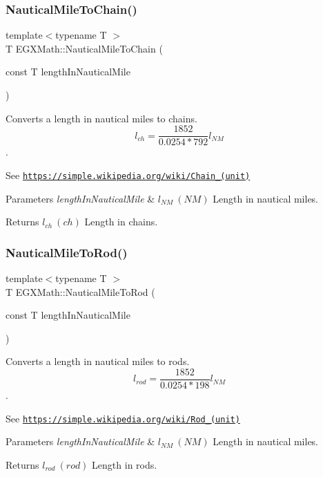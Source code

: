 \subsubsection{\texorpdfstring{Nautical\+Mile\+To\+Chain()}{NauticalMileToChain()}}
{\footnotesize\ttfamily template$<$typename T $>$ \\
T E\+G\+X\+Math\+::\+Nautical\+Mile\+To\+Chain (\begin{DoxyParamCaption}\item[{const T}]{length\+In\+Nautical\+Mile }\end{DoxyParamCaption})}



Converts a length in nautical miles to chains. \[ l_{ch}= \frac{1852}{0.0254 * 792} l_{NM} \]. 

See \href{https://simple.wikipedia.org/wiki/Chain_(unit)}{\tt https\+://simple.\+wikipedia.\+org/wiki/\+Chain\+\_\+(unit)} 
\begin{DoxyParams}{Parameters}
{\em length\+In\+Nautical\+Mile} & $ l_{NM}\ (NM)$ Length in nautical miles. \\
\hline
\end{DoxyParams}
\begin{DoxyReturn}{Returns}
$ l_{ch}\ (ch)$ Length in chains. 
\end{DoxyReturn}
\mbox{\label{group___e_g_x_math-_conversions-_length_conversions-_non-_s_i-_nautical_mile-_surveyors_gafcc747668b6e7d9a786bd74dc9c95c50}} 
\subsubsection{\texorpdfstring{Nautical\+Mile\+To\+Rod()}{NauticalMileToRod()}}
{\footnotesize\ttfamily template$<$typename T $>$ \\
T E\+G\+X\+Math\+::\+Nautical\+Mile\+To\+Rod (\begin{DoxyParamCaption}\item[{const T}]{length\+In\+Nautical\+Mile }\end{DoxyParamCaption})}



Converts a length in nautical miles to rods. \[ l_{rod}= \frac{1852}{0.0254 * 198} l_{NM} \]. 

See \href{https://simple.wikipedia.org/wiki/Rod_(unit)}{\tt https\+://simple.\+wikipedia.\+org/wiki/\+Rod\+\_\+(unit)} 
\begin{DoxyParams}{Parameters}
{\em length\+In\+Nautical\+Mile} & $ l_{NM}\ (NM)$ Length in nautical miles. \\
\hline
\end{DoxyParams}
\begin{DoxyReturn}{Returns}
$ l_{rod}\ (rod)$ Length in rods. 
\end{DoxyReturn}
